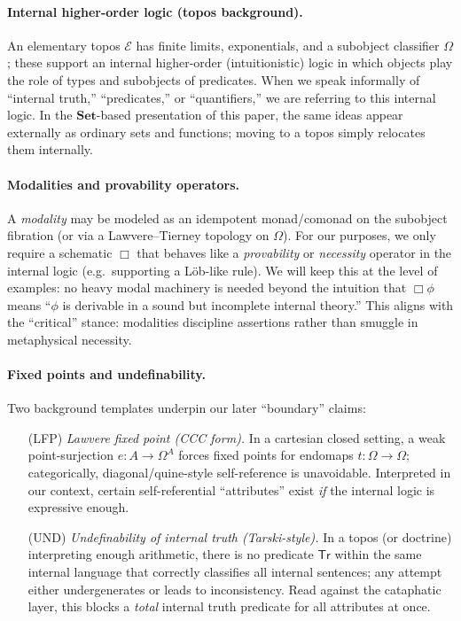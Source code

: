 \documentclass[11pt]{article}
\theoremstyle{upright}
\begin{document}
\paragraph{Internal higher-order logic (topos background).}
An elementary topos \(\mathcal E\) has finite limits, exponentials, and a subobject classifier \(\Omega\); these support an internal higher-order (intuitionistic) logic in which objects play the role of types and subobjects of predicates. When we speak informally of “internal truth,” “predicates,” or “quantifiers,” we are referring to this internal logic. In the \(\mathbf{Set}\)-based presentation of this paper, the same ideas appear externally as ordinary sets and functions; moving to a topos simply relocates them internally.

\paragraph{Modalities and provability operators.}
A \emph{modality} may be modeled as an idempotent monad/comonad on the subobject fibration (or via a Lawvere–Tierney topology on \(\Omega\)). \citep{Lawvere1971Quantifiers} For our purposes, we only require a schematic \(\Box\) that behaves like a \emph{provability} or \emph{necessity} operator in the internal logic (e.g.\ supporting a Löb-like rule). We will keep this at the level of examples: no heavy modal machinery is needed beyond the intuition that \(\Box\phi\) means “\(\phi\) is derivable in a sound but incomplete internal theory.” This aligns with the “critical” stance: modalities discipline assertions rather than smuggle in metaphysical necessity. \citep{Boolos1993}

\paragraph{Fixed points and undefinability.}
Two background templates underpin our later “boundary” claims:

\begin{itemize}[leftmargin=2em]
  \item[(LFP)] \emph{Lawvere fixed point (CCC form).} In a cartesian closed setting, a weak point-surjection \(e:A\to \Omega^{A}\) forces fixed points for endomaps \(t:\Omega\to\Omega\); categorically, diagonal/quine-style self-reference is unavoidable. Interpreted in our context, certain self-referential “attributes” exist \emph{if} the internal logic is expressive enough.
  \item[(UND)] \emph{Undefinability of internal truth (Tarski-style).} In a topos (or doctrine) interpreting enough arithmetic, there is no predicate \(\mathsf{Tr}\) within the same internal language that correctly classifies all internal sentences; any attempt either undergenerates or leads to inconsistency. Read against the cataphatic layer, this blocks a \emph{total} internal truth predicate for all attributes at once.
\end{itemize}
\end{document}
